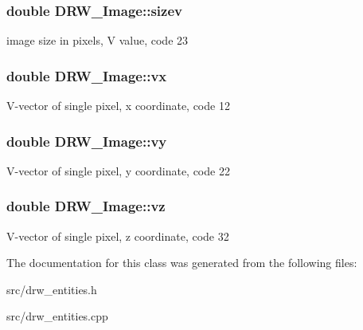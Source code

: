 \subsubsection[{sizev}]{\setlength{\rightskip}{0pt plus 5cm}double D\+R\+W\+\_\+\+Image\+::sizev}\label{class_d_r_w___image_ae2408c33253799a6e03ea1bfec4f84d7}
image size in pixels, V value, code 23 \hypertarget{class_d_r_w___image_a1f7b4a2b11aed54038b1e978a8d99527}{}
\subsubsection[{vx}]{\setlength{\rightskip}{0pt plus 5cm}double D\+R\+W\+\_\+\+Image\+::vx}\label{class_d_r_w___image_a1f7b4a2b11aed54038b1e978a8d99527}
V-\/vector of single pixel, x coordinate, code 12 \hypertarget{class_d_r_w___image_a955bb709e5261c3f5b3ca99bfc5765d1}{}
\subsubsection[{vy}]{\setlength{\rightskip}{0pt plus 5cm}double D\+R\+W\+\_\+\+Image\+::vy}\label{class_d_r_w___image_a955bb709e5261c3f5b3ca99bfc5765d1}
V-\/vector of single pixel, y coordinate, code 22 \hypertarget{class_d_r_w___image_a075d00b1bc78bd275953d9730b0eaf8b}{}
\subsubsection[{vz}]{\setlength{\rightskip}{0pt plus 5cm}double D\+R\+W\+\_\+\+Image\+::vz}\label{class_d_r_w___image_a075d00b1bc78bd275953d9730b0eaf8b}
V-\/vector of single pixel, z coordinate, code 32 

The documentation for this class was generated from the following files\+:\begin{DoxyCompactItemize}
\item 
src/drw\+\_\+entities.\+h\item 
src/drw\+\_\+entities.\+cpp\end{DoxyCompactItemize}
